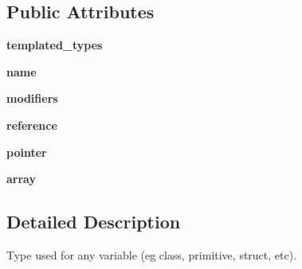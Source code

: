\subsection*{Public Attributes}
\begin{DoxyCompactItemize}
\item 
\mbox{\label{classtests_1_1libs_1_1googletest-master_1_1googlemock_1_1scripts_1_1generator_1_1cpp_1_1ast_1_1Type_a308eba2ff4ed75f065bb31c2f26af4cd}} 
{\bfseries templated\+\_\+types}
\item 
\mbox{\label{classtests_1_1libs_1_1googletest-master_1_1googlemock_1_1scripts_1_1generator_1_1cpp_1_1ast_1_1Type_acc3fa62fb723070cce94ef74f0c4ee7f}} 
{\bfseries name}
\item 
\mbox{\label{classtests_1_1libs_1_1googletest-master_1_1googlemock_1_1scripts_1_1generator_1_1cpp_1_1ast_1_1Type_ae9922b981b528d3f62dfa714215a5f27}} 
{\bfseries modifiers}
\item 
\mbox{\label{classtests_1_1libs_1_1googletest-master_1_1googlemock_1_1scripts_1_1generator_1_1cpp_1_1ast_1_1Type_a50a1eb59c8cf2929217f513c2bb0c580}} 
{\bfseries reference}
\item 
\mbox{\label{classtests_1_1libs_1_1googletest-master_1_1googlemock_1_1scripts_1_1generator_1_1cpp_1_1ast_1_1Type_a54f2b66ef3058dcc90dcff8eecde40a1}} 
{\bfseries pointer}
\item 
\mbox{\label{classtests_1_1libs_1_1googletest-master_1_1googlemock_1_1scripts_1_1generator_1_1cpp_1_1ast_1_1Type_a895355abb533e748b81a79f598092576}} 
{\bfseries array}
\end{DoxyCompactItemize}


\subsection{Detailed Description}
\begin{DoxyVerb}Type used for any variable (eg class, primitive, struct, etc).\end{DoxyVerb}
 

